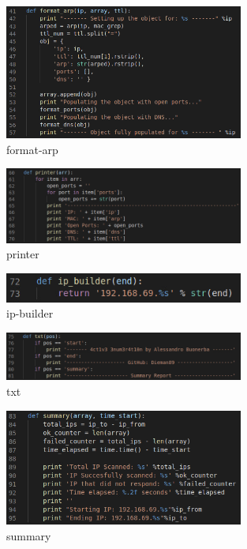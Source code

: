 \begin{figure}[H]
  \centering
  \includegraphics[width=0.7\textwidth]{figures/code/format-arp}
  \caption{format-arp}
  \label{f:format-arp}
\end{figure}

\begin{figure}[H]
  \centering
  \includegraphics[width=0.7\textwidth]{figures/code/printer}
  \caption{printer}
  \label{f:printer}
\end{figure}

\begin{figure}[H]
  \centering
  \includegraphics[width=0.7\textwidth]{figures/code/ip-builder}
  \caption{ip-builder}
  \label{f:ip-builder}
\end{figure}

\begin{figure}[H]
  \centering
  \includegraphics[width=0.7\textwidth]{figures/code/txt}
  \caption{txt}
  \label{f:txt}
\end{figure}

\begin{figure}[H]
  \centering
  \includegraphics[width=0.7\textwidth]{figures/code/summary}
  \caption{summary}
  \label{f:summary}
\end{figure}

